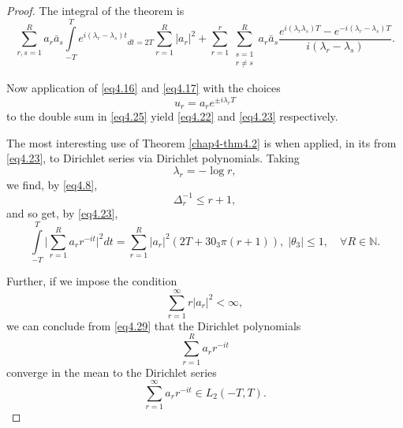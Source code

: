 \begin{proof} %
The integral of the theorem is
\begin{equation*}
\sum_{r,s=1}^R a_r \bar{a}_s \int\limits_{-T}^T e^{i(\lambda_r -
  \lambda_s )t}{_{dt = 2T}} \sum_{r=1}^R|a_r|^2 + \sum_{r=1}^r
\sum_{\substack{s=1 \\ r \neq s}}^R a_r \bar{a}_s \frac{e^{i(\lambda_r
    \lambda_s) T}
-e^{-i(\lambda_r -\lambda_s) T}}{i(\lambda_r - \lambda_s
  )}. \tag{4.25}\label{eq4.25}  
\end{equation*}

Now application of \eqref{eq4.16} and \eqref{eq4.17} with the choices
\begin{equation*}
u_r = a_r e^{\pm i \lambda_r T} \tag{4.26}\label{eq4.26}
\end{equation*}
to the double sum in \eqref{eq4.25} yield \eqref{eq4.22} and
\eqref{eq4.23} respectively.  

The most interesting use of Theorem \ref{chap4-thm4.2} is when
applied, in its from \eqref{eq4.23}, to Dirichlet series via Dirichlet
polynomials. Taking 
\begin{equation*}
\lambda_r = - \log r, \tag{4.27}\label{eq4.27}
\end{equation*} 
we find, by \eqref{eq4.8},
\begin{equation*}
\Delta_r^{-1} \leq r+1, \tag{4.28}\label{eq4.28}
\end{equation*} 
and so get, by \eqref{eq4.23},
\begin{equation*}
\int\limits_{-T}^T \bigg|\sum_{r=1}^R a_r r^{-it} \bigg|^2 dt
= \sum_{r=1}^R |a_r|^2 (2T + 30_3 \pi (r+1)), \; |\theta_3 | \leq 1,\quad
\forall R \in \mathbb{N}. \tag{4.29}\label{eq4.29} 
\end{equation*}

Further, if we impose the condition
\begin{equation*}
\sum_{r=1}^\infty r |a_r|^2 < \infty , \tag{4.30}\label{eq4.30}
\end{equation*} 
we can conclude from \eqref{eq4.29} that the Dirichlet polynomials
\begin{equation*}
\sum_{r=1}^R a_r r^{-it} \tag{4.31}\label{eq4.31}
\end{equation*}\pageoriginale 
converge in the mean to the Dirichlet series
\begin{equation*}
\sum_{r=1}^\infty a_r r^{-it} \in L_2 (-T,
T). \tag{4.32}\label{eq4.32} 
\end{equation*} 
\end{proof}

